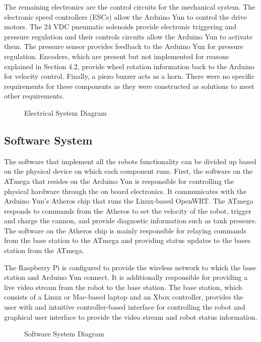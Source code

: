 \documentclass[letterpaper,12pt]{article}
\begin{document}
The remaining electronics are the control circuits for the mechanical system. The electronic speed controllers (ESCs) allow the Arduino Yun to control the drive motors. The 24 VDC pneumatic solenoids provide electronic triggering and pressure regulation and their controls circuits allow the Arduino Yun to activate them. The pressure sensor provides feedback to the Arduino Yun for pressure regulation.  Encoders, which are present but not implemented for reasons explained in Section 4.2, provide wheel rotation information back to the Arduino for velocity control. Finally, a piezo buzzer acts as a horn. There were no specific requirements for these components as they were constructed as solutions to meet other requirements.

\begin{figure}[h!]
  \centering
  
  \caption{Electrical System Diagram}
  \label{fig:e_system}
\end{figure}

\subsection{Software System}
The software that implement all the robots functionality can be divided up based on the physical device on which each component runs. First, the software on the ATmega that resides on the Arduino Yun is responsible for controlling the physical hardware through the on board electronics. It communicates with the Arduino Yun's Atheros chip that runs the Linux-based OpenWRT. The ATmega responds to commands from the Atheros to set the velocity of the robot, trigger and charge the cannon, and provide diagnostic information such as tank pressure. The software on the Atheros chip is mainly responsible for relaying commands from the base station to the ATmega and providing status updates to the bases station from the ATmega. 

The Raspberry Pi is configured to provide the wireless network to which the base station and Arduino Yun connect. It is additionally responsible for providing a live video stream from the robot to the base station. The base station, which consists of a Linux or Mac-based laptop and an Xbox controller, provides the user with and intuitive controller-based interface for controlling the robot and graphical user interface to provide the video stream and robot status information.

\begin{figure}[h!]
  \centering
  
  \caption{Software System Diagram}
  \label{fig:system_diagram}
\end{figure}
\end{document}
